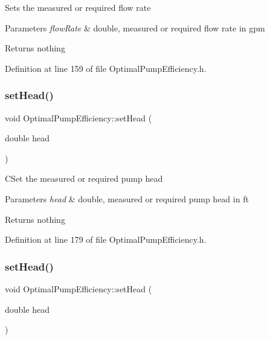 Sets the measured or required flow rate


\begin{DoxyParams}{Parameters}
{\em flow\+Rate} & double, measured or required flow rate in gpm\\
\hline
\end{DoxyParams}
\begin{DoxyReturn}{Returns}
nothing 
\end{DoxyReturn}


Definition at line 159 of file Optimal\+Pump\+Efficiency.\+h.

\mbox{\label{class_optimal_pump_efficiency_ac317c900ec68797cf051977147ea33da}} 
\subsubsection{\texorpdfstring{set\+Head()}{setHead()}\hspace{0.1cm}{\footnotesize\ttfamily [1/3]}}
{\footnotesize\ttfamily void Optimal\+Pump\+Efficiency\+::set\+Head (\begin{DoxyParamCaption}\item[{double}]{head }\end{DoxyParamCaption})\hspace{0.3cm}{\ttfamily [inline]}}

C\+Set the measured or required pump head


\begin{DoxyParams}{Parameters}
{\em head} & double, measured or required pump head in ft\\
\hline
\end{DoxyParams}
\begin{DoxyReturn}{Returns}
nothing 
\end{DoxyReturn}


Definition at line 179 of file Optimal\+Pump\+Efficiency.\+h.

\mbox{\label{class_optimal_pump_efficiency_ac317c900ec68797cf051977147ea33da}} 
\subsubsection{\texorpdfstring{set\+Head()}{setHead()}\hspace{0.1cm}{\footnotesize\ttfamily [2/3]}}
{\footnotesize\ttfamily void Optimal\+Pump\+Efficiency\+::set\+Head (\begin{DoxyParamCaption}\item[{double}]{head }\end{DoxyParamCaption})\hspace{0.3cm}{\ttfamily [inline]}}

